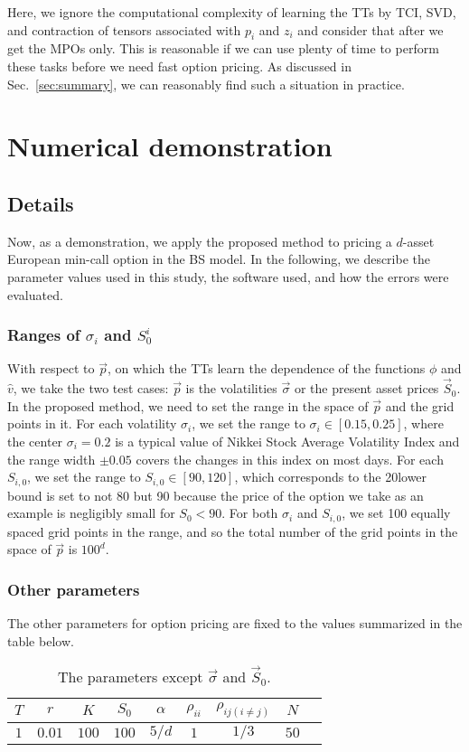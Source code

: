Here, we ignore the computational complexity of learning the TTs by TCI, SVD, and contraction of tensors associated with $p_i$ and $z_{i}$ and consider that after we get the MPOs only. 
This is reasonable if we can use plenty of time to perform these tasks
before we need fast option pricing.
As discussed in Sec.~\ref{sec:summary}, we can reasonably find such a situation in practice.


\section{Numerical demonstration}\label{sec:demo}
\subsection{Details}
Now, as a demonstration, we apply the proposed method to pricing a $d$-asset European min-call option in the BS model.
In the following, we describe the parameter values used in this study, the software used, and how the errors were evaluated.

\subsubsection*{Ranges of ${\sigma_i}$ and ${S^i_0}$}
With respect to $\vec{p}$, on which the TTs learn the dependence of the functions $\phi$ and $\hat{v}$, we take the two test cases: $\vec{p}$ is the volatilities $\vec{\sigma}$ or the present asset prices $\vec{S}_0$. 
In the proposed method, we need to set the range in the space of $\vec{p}$ and the grid points in it.
For each volatility $\sigma_i$, we set the range to $\sigma_i \in [0.15, 0.25]$, where the center $\sigma_i=0.2$ is a typical value of Nikkei Stock Average Volatility Index \cite{nikkei_vi} and the range width $\pm 0.05$ covers the changes in this index on most days.
For each $S_{i,0}$, we set the range to $S_{i,0} \in [90, 120]$, which corresponds to the 20\The lower bound is set to not 80 but 90 because the price of the option we take as an example is negligibly small for $S_0 < 90$.
For both $\sigma_i$ and $S_{i,0}$, we set 100 equally spaced grid points in the range, and so the total number of the grid points in the space of $\vec{p}$ is $100^d$.

\subsubsection*{Other parameters}
The other parameters for option pricing are fixed to the values summarized in the table below.
\begin{table}[hbtp]
\centering
\begin{tabular}{|c|c|c|c|c|c|c|c|c|}
    \hline
    $T$ & $r$ & $K$ &$S_0$ & $\alpha$ & $\rho_{ii}$ & $\rho_{ij(i\ne j)}$ & $N$ \\
    \hline
    $1$ & $0.01$ & $100$ &$100$ & $5/d$ & $1$ & $1/3$ & $50$  \\
    \hline
\end{tabular}
\caption{The parameters except $\vec{\sigma}$ and $\vec{S}_0$.}
\label{tab:tt_1d_table}
\end{table}

